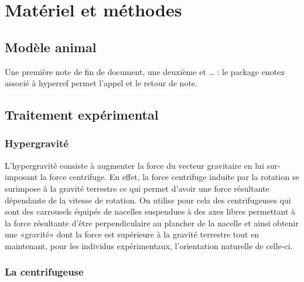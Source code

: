 \chaptertoc{}

\section{Matériel et méthodes}

	\subsection{Modèle animal}

	\lipsum[1]

	Une première note de fin de document, une deuxième et \ldots {}      : le package enotez associé à hyperref permet l'appel et le retour de note.

	\subsection{Traitement expérimental}

		\subsubsection{Hypergravité}
			\label{hypergravite} %

			L'hypergravité consiste à augmenter la force du vecteur gravitaire en lui sur-imposant la force centrifuge. En effet, la force centrifuge induite par la rotation se surimpose à la gravité terrestre ce qui permet d'avoir une force résultante dépendante de la vitesse de rotation. On utilise pour cela des centrifugeuses qui sont des carrousels équipés de nacelles suspendues à des axes libres permettant à la force résultante d'être perpendiculaire au plancher de la nacelle et ainsi obtenir une «gravité» dont la force est supérieure à la gravité terrestre tout en maintenant, pour les individus expérimentaux, l'orientation \og naturelle \fg{} de celle-ci.
		
		\subsubsection{La centrifugeuse}

